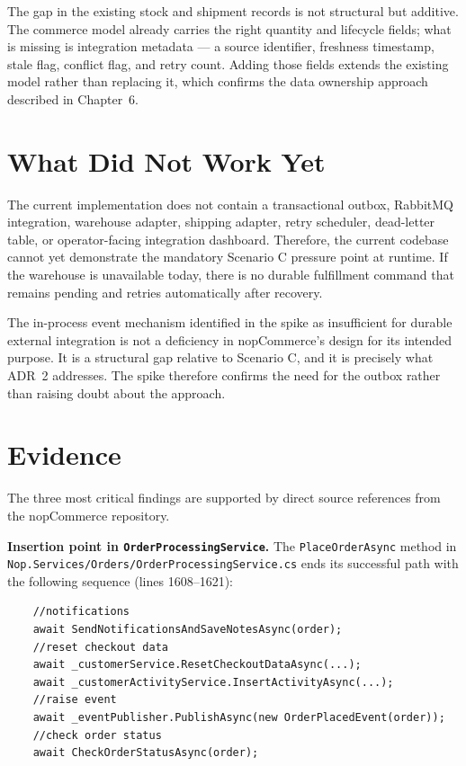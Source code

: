The gap in the existing stock and shipment records is not structural but additive. The commerce
model already carries the right quantity and lifecycle fields; what is missing is integration
metadata --- a source identifier, freshness timestamp, stale flag, conflict flag, and retry
count. Adding those fields extends the existing model rather than replacing it, which confirms
the data ownership approach described in Chapter~6.

\section{What Did Not Work Yet}

The current implementation does not contain a transactional outbox, RabbitMQ integration,
warehouse adapter, shipping adapter, retry scheduler, dead-letter table, or operator-facing
integration dashboard. Therefore, the current codebase cannot yet demonstrate the mandatory
Scenario C pressure point at runtime. If the warehouse is unavailable today, there is no
durable fulfillment command that remains pending and retries automatically after recovery.

The in-process event mechanism identified in the spike as insufficient for durable external
integration is not a deficiency in nopCommerce's design for its intended purpose. It is a
structural gap relative to Scenario C, and it is precisely what ADR~2 addresses. The spike
therefore confirms the need for the outbox rather than raising doubt about the approach.

\section{Evidence}

The three most critical findings are supported by direct source references from the nopCommerce
repository.

\textbf{Insertion point in \texttt{OrderProcessingService}.}
The \texttt{PlaceOrderAsync} method in
\texttt{Nop.Services/Orders/OrderProcessingService.cs} ends its successful path with the
following sequence (lines 1608--1621):

\begin{verbatim}
    //notifications
    await SendNotificationsAndSaveNotesAsync(order);
    //reset checkout data
    await _customerService.ResetCheckoutDataAsync(...);
    await _customerActivityService.InsertActivityAsync(...);
    //raise event
    await _eventPublisher.PublishAsync(new OrderPlacedEvent(order));
    //check order status
    await CheckOrderStatusAsync(order);
\end{verbatim}

